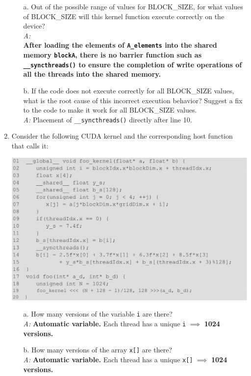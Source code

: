 \begin{enumerate}
\begin{itemize}
                  \item[a.] Out of the possible range of values for BLOCK\_SIZE, for what values of BLOCK\_SIZE will this kernel function execute correctly on the device?
                        \\ \textsl{A: }
                        \\\textbf{ After loading the elements of \texttt{A\_elements} into the shared memory \texttt{blockA}, there is no barrier function such as \texttt{\_\_syncthreads()} to ensure the completion of write operations of all the threads into the shared memory.}
                  \item[b.] If the code does not execute correctly for all BLOCK\_SIZE values, what is the root cause of this incorrect execution behavior? Suggest a fix to the code to make it work for all BLOCK\_SIZE values.
                        \\\textsl{A:} Placement of \texttt{\_\_syncthreads()} directly after line 10.
            \end{itemize}
      \item Consider the following CUDA kernel and the corresponding host function that calls it:
            \begin{center}
                  \includegraphics[width=0.8\linewidth]{Images/Memories/foo_kernel.png}
            \end{center}
            \begin{itemize}
                  \item[a.] How many versions of the variable \texttt{i} are there?
                        \\\textsl{A:} \textbf{Automatic variable.} Each thread has a unique \texttt{i} \(\implies\) \textbf{1024 versions.}
                  \item[b.] How many versions of the array \texttt{x[]} are there?
                        \\\textsl{A:} \textbf{Automatic variable.} Each thread has a unique \texttt{x[]} \(\implies\) \textbf{1024 versions.}

\end{itemize}
\end{enumerate}
